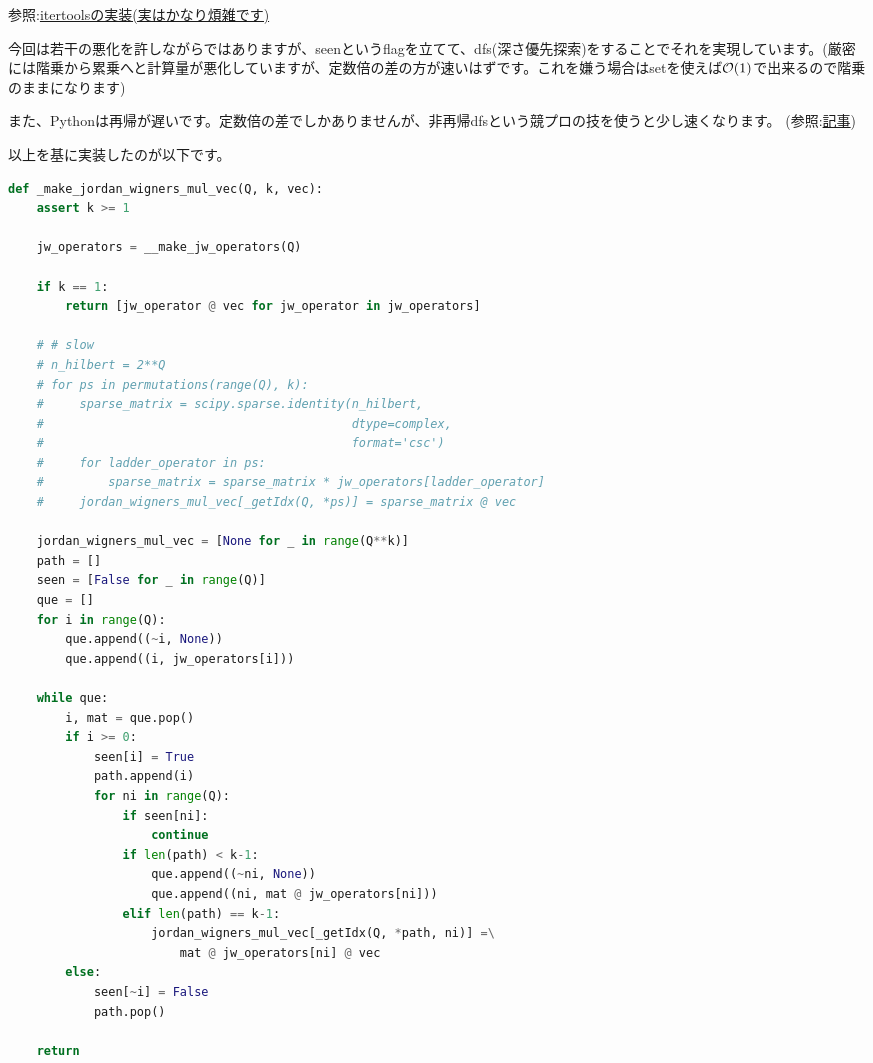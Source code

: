 \documentclass[a4paper, 10pt, dvipdfmx]{jlreq}
\begin{document}
参照:\href{https://docs.python.org/ja/3/library/itertools.html#itertools.permutations}{itertoolsの実装(実はかなり煩雑です)}

今回は若干の悪化を許しながらではありますが、seenというflagを立てて、dfs(深さ優先探索)をすることでそれを実現しています。(厳密には階乗から累乗へと計算量が悪化していますが、定数倍の差の方が速いはずです。これを嫌う場合はsetを使えば$\order{1}$で出来るので階乗のままになります)

また、Pythonは再帰が遅いです。定数倍の差でしかありませんが、非再帰dfsという競プロの技を使うと少し速くなります。
(参照:\href{https://qiita.com/KowerKoint/items/870ea9ef7a39f3fe4ce3}{記事})

以上を基に実装したのが以下です。

\begin{lstlisting}[caption=code, label=code:code, language=Python]
def _make_jordan_wigners_mul_vec(Q, k, vec):
    assert k >= 1

    jw_operators = __make_jw_operators(Q)

    if k == 1:
        return [jw_operator @ vec for jw_operator in jw_operators]

    # # slow
    # n_hilbert = 2**Q
    # for ps in permutations(range(Q), k):
    #     sparse_matrix = scipy.sparse.identity(n_hilbert,
    #                                           dtype=complex,
    #                                           format='csc')
    #     for ladder_operator in ps:
    #         sparse_matrix = sparse_matrix * jw_operators[ladder_operator]
    #     jordan_wigners_mul_vec[_getIdx(Q, *ps)] = sparse_matrix @ vec

    jordan_wigners_mul_vec = [None for _ in range(Q**k)]
    path = []
    seen = [False for _ in range(Q)]
    que = []
    for i in range(Q):
        que.append((~i, None))
        que.append((i, jw_operators[i]))

    while que:
        i, mat = que.pop()
        if i >= 0:
            seen[i] = True
            path.append(i)
            for ni in range(Q):
                if seen[ni]:
                    continue
                if len(path) < k-1:
                    que.append((~ni, None))
                    que.append((ni, mat @ jw_operators[ni]))
                elif len(path) == k-1:
                    jordan_wigners_mul_vec[_getIdx(Q, *path, ni)] =\
                        mat @ jw_operators[ni] @ vec
        else:
            seen[~i] = False
            path.pop()

    return 
\end{lstlisting}
\end{document}
